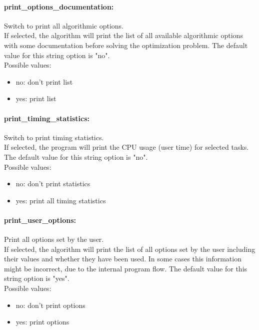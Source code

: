 \paragraph{print\_options\_documentation:}\label{sec:print_options_documentation} Switch to print all algorithmic options. $\;$ \\
 If selected, the algorithm will print the list of
all available algorithmic options with some
documentation before solving the optimization
problem.
The default value for this string option is "no".
\\ 
Possible values:
\begin{itemize}
   \item no: don't print list
   \item yes: print list
\end{itemize}

\paragraph{print\_timing\_statistics:}\label{sec:print_timing_statistics} Switch to print timing statistics. $\;$ \\
 If selected, the program will print the CPU usage
(user time) for selected tasks.
The default value for this string option is "no".
\\ 
Possible values:
\begin{itemize}
   \item no: don't print statistics
   \item yes: print all timing statistics
\end{itemize}

\paragraph{print\_user\_options:}\label{sec:print_user_options} Print all options set by the user. $\;$ \\
 If selected, the algorithm will print the list of
all options set by the user including their
values and whether they have been used.  In some
cases this information might be incorrect, due to
the internal program flow.
The default value for this string option is "yes".
\\ 
Possible values:
\begin{itemize}
   \item no: don't print options
   \item yes: print options
\end{itemize}


